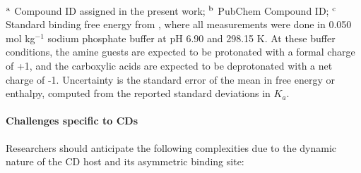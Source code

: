 \documentclass[aps,pre,twocolumn,nofootinbib,superscriptaddress,10pt, final,tightenlines]{revtex4-1}
\begin{document}
\begin{table}
\begin{tabular}{lllp{2cm}>{\ttfamily}llS[table-format=-1.3, table-figures-uncertainty=1]S[table-format=-1.2, table-figures-uncertainty=1]}
\bottomrule
\end{tabular}\\
$^{\rm a}$ Compound ID assigned in the present work; $^{\rm b}$ PubChem Compound ID; $^{\rm c}$ Standard binding free energy from \cite{rekharsky_thermodynamic_1997}, where all measurements were done in 0.050 mol kg$^{-1}$ sodium phosphate buffer at pH 6.90 and 298.15 K. At these buffer conditions, the amine guests are expected to be protonated with a formal charge of +1, and the carboxylic acids are expected to be deprotonated with a net charge of -1. Uncertainty is the standard error of the mean in free energy or enthalpy, computed from the reported standard deviations in $K_a$. 
\end{table}
\endgroup

\paragraph{Challenges specific to CDs}
Researchers should anticipate the following complexities due to the dynamic nature of the CD host and its asymmetric binding site:
\end{document}
